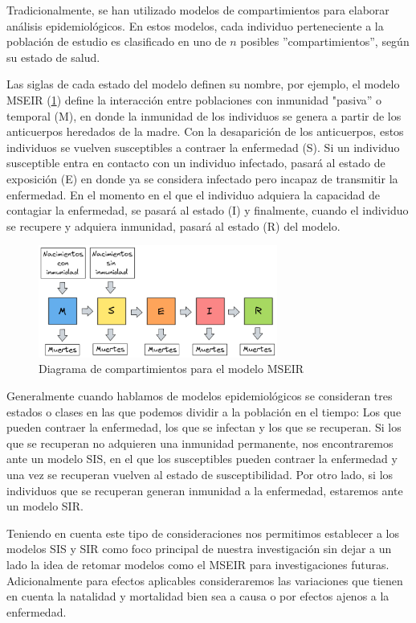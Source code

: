 Tradicionalmente, se han utilizado modelos de compartimientos para elaborar análisis epidemiológicos. En estos modelos, cada individuo perteneciente a la población de estudio es clasificado en uno de $n$ posibles ''compartimientos'', según su estado de salud.

Las siglas de cada estado del modelo definen su nombre, por ejemplo, el modelo MSEIR (\ref{fig:diagrama MSEIR}) define la interacción entre poblaciones con inmunidad "pasiva'' o temporal (M), en donde la inmunidad de los individuos se genera a partir de los anticuerpos heredados de la madre. Con la desaparición de los anticuerpos, estos individuos se vuelven susceptibles a contraer la enfermedad (S). Si un individuo susceptible entra en contacto con un individuo infectado, pasará al estado de exposición (E) en donde ya se considera infectado pero incapaz de transmitir la enfermedad. En el momento en el que el individuo adquiera la capacidad de contagiar la enfermedad, se pasará al estado (I) y finalmente, cuando el individuo se recupere y adquiera inmunidad, pasará al estado (R) del modelo.\cite{modelCompartimental}

\begin{figure}[h]
  \centering
    \includegraphics[width=0.7\textwidth]{Imagenes/MSEIR_compatimientos.PNG}
  \caption{Diagrama de compartimientos para el modelo MSEIR}
  \label{fig:diagrama MSEIR}
\end{figure}

Generalmente cuando hablamos de modelos epidemiológicos se consideran tres estados o clases en las que podemos dividir a la población en el tiempo: Los que pueden contraer la enfermedad, los que se infectan y los que se recuperan. Si los que se recuperan no adquieren una inmunidad permanente, nos encontraremos ante un modelo SIS, en el que los susceptibles pueden contraer la enfermedad y una vez se recuperan vuelven al estado de susceptibilidad. Por otro lado, si los individuos que se recuperan generan inmunidad a la enfermedad, estaremos ante un modelo SIR. 

Teniendo en cuenta este tipo de consideraciones nos permitimos establecer a los modelos SIS y SIR como foco principal de nuestra investigación sin dejar a un lado la idea de retomar modelos como el MSEIR para investigaciones futuras. Adicionalmente para efectos aplicables consideraremos las variaciones que tienen en cuenta la natalidad y mortalidad bien sea a causa o por efectos ajenos a la enfermedad.

